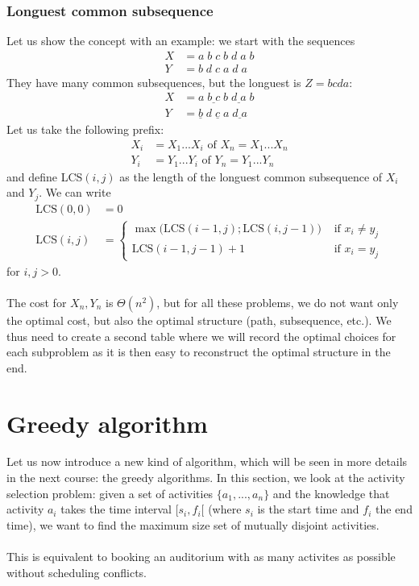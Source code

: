 \subsubsection*{Longuest common subsequence}

Let us show the concept with an example: we start with the sequences 
\begin{align*}
X & = a\;b\;c\;b\;d\;a\;b\\
Y & = b\;d\;c\;a\;d\;a
\end{align*}
They have many common subsequences, but the longuest is $Z = bcda$:
\begin{align*}
X & = a\;\underline{b\;c}\;b\;\underline{d\;a}\;b\\
Y & = \underline{b}\;d\;\underline{c}\;a\;\underline{d\;a}
\end{align*}
Let us take the following prefix:
\begin{align*}
X_i & = X_1...X_i \text{ of } X_n = X_1...X_n \\
Y_i & = Y_1...Y_i \text{ of } Y_n = Y_1...Y_n
\end{align*}
and define LCS$(i,j)$ as the length of the longuest common subsequence of $X_i$ and $Y_j$. We can write
\begin{align*}
\text{LCS}(0,0) & = 0 \\
\text{LCS}(i,j) & = \begin{cases}
\max \big(\text{LCS}(i-1,j);\text{LCS}(i,j-1)\big) & \text{ if } x_i \neq y_j \\
\text{LCS}(i-1,j-1)+1 & \text{ if } x_i = y_j 
\end{cases}
\end{align*}
for $i,j > 0$.
\\ \\
The cost for $X_n,Y_n$ is $\Theta (n^2)$, but for all these problems, we do not want only the optimal cost, but also the optimal structure (path, subsequence, etc.). We thus need to create a second table where we will record the optimal choices for each subproblem as it is then easy to reconstruct the optimal structure in the end.

\section{Greedy algorithm}

Let us now introduce a new kind of algorithm, which will be seen in more details in the next course: the greedy algorithms. In this section, we look at the activity selection problem: given a set of activities $\{a_1,...,a_n\}$ and the knowledge that activity $a_i$ takes the time interval $[s_i, f_i[$ (where $s_i$ is the start time and $f_i$ the end time), we want to find the maximum size set of mutually disjoint activities.
\\ \\
This is equivalent to booking an auditorium with as many activites as possible without scheduling conflicts.


